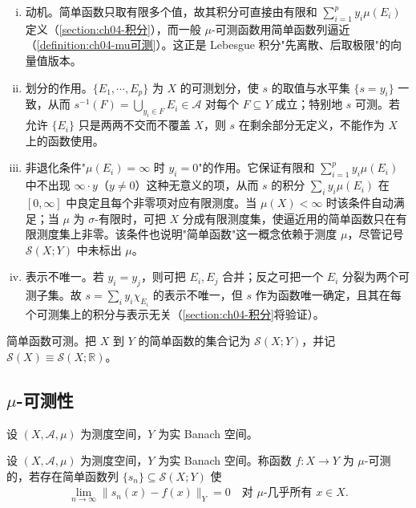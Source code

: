 \documentclass[../../main.tex]{subfiles}%
\begin{document}
\begin{remark}\label{remark:ch04-简单函数动机}
\begin{enumerate}[(i)]
\item 动机。简单函数只取有限多个值，故其积分可直接由有限和 $\sum_{i=1}^p y_i\mu(E_i)$ 定义（\cref{section:ch04-积分}），而一般 $\mu$-可测函数用简单函数列逼近（\cref{definition:ch04-mu可测}）。这正是 Lebesgue 积分"先离散、后取极限"的向量值版本。
\item 划分的作用。$\{E_1,\cdots ,E_p\}$ 为 $X$ 的可测划分，使 $s$ 的取值与水平集 $\{s=y_i\}$ 一致，从而 $s^{-1}(F)=\bigcup_{y_i\in F}E_i\in\mathcal{A}$ 对每个 $F\subseteq Y$ 成立；特别地 $s$ 可测。若允许 $\{E_i\}$ 只是两两不交而不覆盖 $X$，则 $s$ 在剩余部分无定义，不能作为 $X$ 上的函数使用。
\item 非退化条件"$\mu(E_i)=\infty$ 时 $y_i=0$"的作用。它保证有限和 $\sum_{i=1}^p y_i\mu(E_i)$ 中不出现 $\infty\cdot y$（$y\neq0$）这种无意义的项，从而 $s$ 的积分 $\sum_iy_i\mu(E_i)$ 在 $[0,\infty]$ 中良定且每个非零项对应有限测度。当 $\mu(X)<\infty$ 时该条件自动满足；当 $\mu$ 为 $\sigma$-有限时，可把 $X$ 分成有限测度集，使逼近用的简单函数只在有限测度集上非零。该条件也说明"简单函数"这一概念依赖于测度 $\mu$，尽管记号 $\mathcal{S}(X;Y)$ 中未标出 $\mu$。
\item 表示不唯一。若 $y_i=y_j$，则可把 $E_i,E_j$ 合并；反之可把一个 $E_i$ 分裂为两个可测子集。故 $s=\sum_iy_i\chi_{E_i}$ 的表示不唯一，但 $s$ 作为函数唯一确定，且其在每个可测集上的积分与表示无关（\cref{section:ch04-积分}将验证）。
\end{enumerate}
\end{remark}

简单函数可测。把 $X$ 到 $Y$ 的简单函数的集合记为 $\mathcal{S}(X;Y)$，并记 $\mathcal{S}(X)\equiv\mathcal{S}(X;\mathbb{R})$。

\subsection{$\mu$-可测性}\label{subsection:ch04-mu可测性}

设 $(X,\mathcal{A},\mu)$ 为测度空间，$Y$ 为实 Banach 空间。

\begin{definition}[$\mu$-可测性]\label{definition:ch04-mu可测}
设 $(X,\mathcal{A},\mu)$ 为测度空间，$Y$ 为实 Banach 空间。称函数 $f:X\to Y$ 为 $\mu$-可测的，若存在简单函数列 $\{s_n\}\subseteq\mathcal{S}(X;Y)$ 使
\begin{align}
\lim_{n\to\infty}\|s_n(x)-f(x)\|_Y=0\quad\text{对 }\mu\text{-几乎所有 }x\in X. \label{align:ch04-4.6}
\end{align}
\end{definition}
\end{document}
